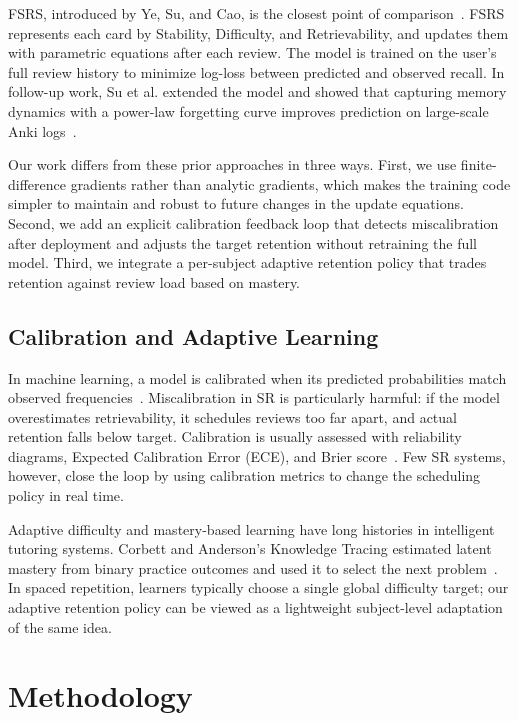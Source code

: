 \documentclass[conference]{IEEEtran}
\begin{document}
FSRS, introduced by Ye, Su, and Cao, is the closest point of comparison~\cite{ye2022fsrs, su2024tkde}. FSRS represents each card by Stability, Difficulty, and Retrievability, and updates them with parametric equations after each review. The model is trained on the user's full review history to minimize log-loss between predicted and observed recall. In follow-up work, Su et al. extended the model and showed that capturing memory dynamics with a power-law forgetting curve improves prediction on large-scale Anki logs~\cite{su2024tkde}.

Our work differs from these prior approaches in three ways. First, we use finite-difference gradients rather than analytic gradients, which makes the training code simpler to maintain and robust to future changes in the update equations. Second, we add an explicit calibration feedback loop that detects miscalibration after deployment and adjusts the target retention without retraining the full model. Third, we integrate a per-subject adaptive retention policy that trades retention against review load based on mastery.

\subsection{Calibration and Adaptive Learning}

In machine learning, a model is calibrated when its predicted probabilities match observed frequencies~\cite{dawid1982well}. Miscalibration in SR is particularly harmful: if the model overestimates retrievability, it schedules reviews too far apart, and actual retention falls below target. Calibration is usually assessed with reliability diagrams, Expected Calibration Error (ECE), and Brier score~\cite{naeini2015obtaining}. Few SR systems, however, close the loop by using calibration metrics to change the scheduling policy in real time.

Adaptive difficulty and mastery-based learning have long histories in intelligent tutoring systems. Corbett and Anderson's Knowledge Tracing estimated latent mastery from binary practice outcomes and used it to select the next problem~\cite{corbett1994knowledge}. In spaced repetition, learners typically choose a single global difficulty target; our adaptive retention policy can be viewed as a lightweight subject-level adaptation of the same idea.

\section{Methodology}\label{sec:method}
\end{document}
